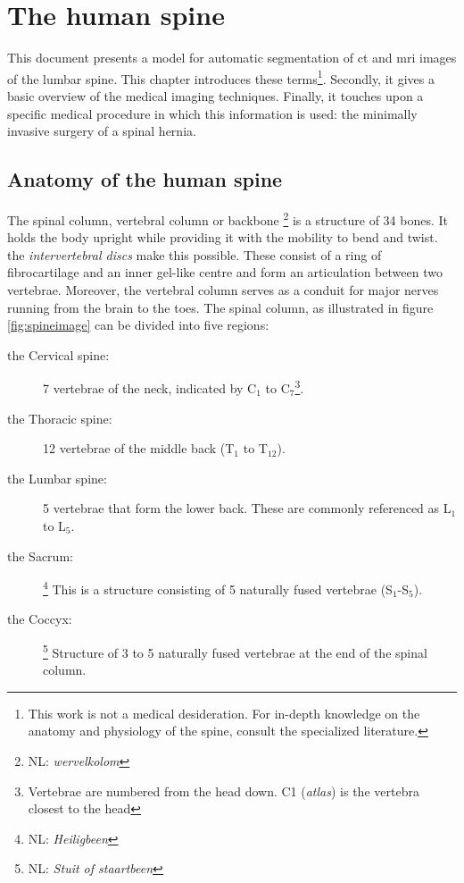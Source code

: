 \chapter{The human spine}
\par{
    This document presents a model for automatic segmentation of \acrfull{ct} and \acrfull{mri} images of the lumbar spine.
    This chapter introduces these terms\footnote{This work is not a medical desideration. For in-depth knowledge on the anatomy and physiology of the spine, consult the specialized literature.}.
    Secondly, it gives a basic overview of the medical imaging techniques. 
    Finally, it touches upon a specific medical procedure in which this information is used: the minimally invasive surgery of a spinal hernia.
}



\section{Anatomy of the human spine}

\par{
    The spinal column, vertebral column or backbone \footnote{NL: \textit{wervelkolom}} is a structure of 34 bones. 
    It holds the body upright while providing it with the mobility to bend and twist.
    the \textit{intervertebral discs} make this possible. These consist of a ring of fibrocartilage and an inner gel-like centre and form an articulation between two vertebrae.
    Moreover, the vertebral column serves as a conduit for major nerves running from the brain to the toes.
    The spinal column, as illustrated in figure \ref{fig:spineimage} can be divided into five regions:
}

\begin{description}
    \item[the Cervical spine:] 7 vertebrae of the neck, indicated by C$_1$ to C$_7$\footnote{Vertebrae are numbered from the head down. C1 (\textit{atlas}) is the vertebra closest to the head}.
    \item[the Thoracic spine:] 12 vertebrae of the middle back (T$_1$ to T$_{12}$).
    \item[the Lumbar spine:] 5 vertebrae that form the lower back. These are commonly referenced as L$_1$ to L$_5$.
    \item[the Sacrum:]\footnote{NL: \textit{Heiligbeen}} This is a structure consisting of 5 naturally fused vertebrae (S$_1$-S$_5$).
    \item[the Coccyx:]\footnote{NL: \textit{Stuit of staartbeen}} Structure of 3 to 5 naturally fused vertebrae at the end of the spinal column.
\end{description}


